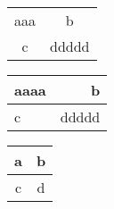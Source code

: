 \documentclass{article}
\begin{document}
\begin{tabular}{|c|c|}
aaa & b \\
c & ddddd\\
\end{tabular}

\begin{tabular}{|l|r|}
\hline
aaaa & b \\
\hline
c & ddddd\\
\hline
\end{tabular}

\begin{center}
\begin{tabular}{|c|c|}
\hline
a & b \\ \hline
c & d\\
\hline
\end{tabular}
\end{center}
\end{document}
